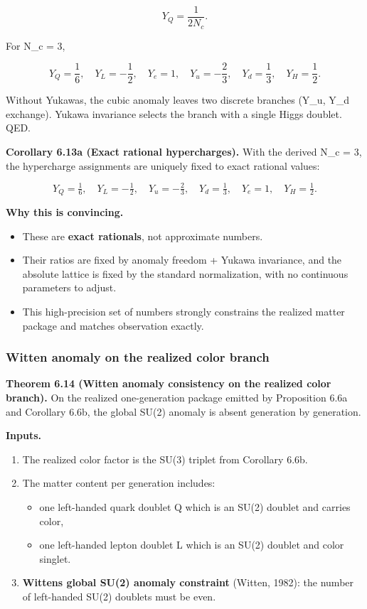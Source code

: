 \[
Y_Q = \frac{1}{2 N_c}.
\]

For N\_c = 3,

\[
Y_Q = \frac{1}{6},\quad Y_L = -\frac{1}{2},\quad Y_e = 1,\quad
Y_u = -\frac{2}{3},\quad Y_d = \frac{1}{3},\quad Y_H = \frac{1}{2}.
\]

Without Yukawas, the cubic anomaly leaves two discrete branches (Y\_u, Y\_d exchange). Yukawa invariance selects the branch with a single Higgs doublet. QED.

\textbf{Corollary 6.13a (Exact rational hypercharges).} With the derived N\_c = 3, the hypercharge assignments are uniquely fixed to exact rational values:

\[
Y_Q = \tfrac{1}{6}, \quad
Y_L = -\tfrac{1}{2}, \quad
Y_u = -\tfrac{2}{3}, \quad
Y_d = \tfrac{1}{3}, \quad
Y_e = 1, \quad
Y_H = \tfrac{1}{2}.
\]

\textbf{Why this is convincing.}

\begin{itemize}
\tightlist
\item
  These are \textbf{exact rationals}, not approximate numbers.
\item
  Their ratios are fixed by anomaly freedom + Yukawa invariance, and the absolute lattice is fixed by the standard normalization, with no continuous parameters to adjust.
\item
  This high-precision set of numbers strongly constrains the realized matter package and matches observation exactly.
\end{itemize}

\subsubsection{Witten anomaly on the realized color branch}\label{69-witten-anomaly-and-the-number-of-colors}

\textbf{Theorem 6.14 (Witten anomaly consistency on the realized color branch).} On the realized one-generation package emitted by Proposition 6.6a and Corollary 6.6b, the global SU(2) anomaly is absent generation by generation.

\textbf{Inputs.}

\begin{enumerate}
\def\labelenumi{\arabic{enumi}.}
\tightlist
\item
  The realized color factor is the SU(3) triplet from Corollary 6.6b.
\item
  The matter content per generation includes:

  \begin{itemize}
  \tightlist
  \item
    one left-handed quark doublet Q which is an SU(2) doublet and carries color,
  \item
    one left-handed lepton doublet L which is an SU(2) doublet and color singlet.
  \end{itemize}
\item
  \textbf{Witten\textquotesingle s global SU(2) anomaly constraint} (Witten, 1982): the number of left-handed SU(2) doublets must be even.
\end{enumerate}

